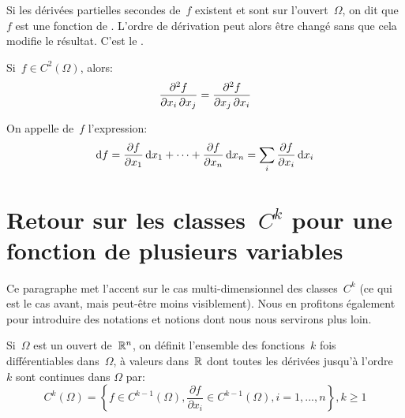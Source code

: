 Si  les dérivées partielles secondes de~$f$ existent et sont 
sur l'ouvert~$\Omega$, on dit que~$f$ est une fonction de .
L'ordre de dérivation peut alors être changé sans que cela modifie le résultat.
C'est le .
\begin{theoreme}
Si~$f\in C^2(\Omega)$, alors:
\begin{equation}\colorred
  \frac{\partial^2f}{\partial x_i\, \partial x_j} = \frac{\partial^2f} {\partial x_j\, \partial x_i}
\end{equation}
\end{theoreme}

\begin{definition}
On appelle  de~$f$ l'expression:
\begin{equation}
  \text{d} f=\frac{\partial f}{\partial x_1}\,\text{d} x_1+\cdots+\frac{\partial f}{\partial x_n}\,\text{d} x_n
=  \displaystyle\sum_i \frac{\partial f}{\partial x_i}\,\text{d} x_i
\end{equation}
\end{definition}

\medskip
\section{Retour sur les classes~$C^k$ pour une fonction de plusieurs variables}

Ce paragraphe met l'accent sur le cas multi-dimensionnel des classes~$C^k$
(ce qui est le cas avant, mais peut-être moins visiblement).
Nous en profitons également pour introduire des notations et notions dont nous
nous servirons plus loin.

\medskip
\begin{definition}
Si~$\Omega$ est un ouvert de~$\mathbb R^n$, on définit l'ensemble des
fonctions~$k$ fois différentiables dans~$\Omega$, à valeurs
dans~$\mathbb R$ dont toutes les dérivées jusqu'à l'ordre~$k$ sont continues dans
$\Omega$ par:
\begin{equation}
C^k(\Omega) = \left\{f\in C^{k-1}(\Omega), \dfrac{\partial f}{\partial x_i}\in C^{k-1}(\Omega),
i=1, ..., n\right\}, k\ge 1
\end{equation}
\end{definition}

